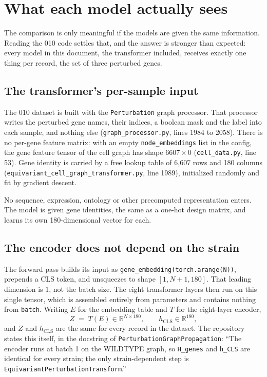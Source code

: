 
\section{What each model actually sees}
\label{sec:sees}

The comparison is only meaningful if the models are given the same information.
Reading the 010 code settles that, and the answer is stronger than expected:
every model in this document, the transformer included, receives exactly one
thing per record, the set of three perturbed genes.

\subsection{The transformer's per-sample input}

The 010 dataset is built with the \texttt{Perturbation} graph processor. That
processor writes the perturbed gene names, their indices, a boolean mask and the
label into each sample, and nothing else
(\texttt{graph\_processor.py}, lines 1984 to 2058). There is no per-gene feature
matrix: with an empty \texttt{node\_embeddings} list in the config, the gene
feature tensor of the cell graph has shape $6607 \times 0$
(\texttt{cell\_data.py}, line 53). Gene identity is carried by a free lookup
table of 6{,}607 rows and 180 columns
(\texttt{equivariant\_cell\_graph\_transformer.py}, line 1989), initialized
randomly and fit by gradient descent.

No sequence, expression, ontology or other precomputed representation enters.
The model is given gene identities, the same as a one-hot design matrix, and
learns its own 180-dimensional vector for each.

\subsection{The encoder does not depend on the strain}
\label{sec:encoder}

The forward pass builds its input as
\texttt{gene\_embedding(torch.arange(N))}, prepends a CLS token, and unsqueezes
to shape $[1, N{+}1, 180]$. That leading dimension is $1$, not the batch size.
The eight transformer layers then run on this single tensor, which is assembled
entirely from parameters and contains nothing from \texttt{batch}. Writing $E$
for the embedding table and $T$ for the eight-layer encoder,
%
\begin{equation}
  Z \;=\; T(E) \in \mathbb{R}^{N \times 180},
  \qquad
  h_{\mathrm{CLS}} \in \mathbb{R}^{180},
  \label{eq:encoder}
\end{equation}
%
and $Z$ and $h_{\mathrm{CLS}}$ are the same for every record in the dataset. The
repository states this itself, in the docstring of
\texttt{PerturbationGraphPropagation}: ``The encoder runs at batch 1 on the
WILDTYPE graph, so \texttt{H\_genes} and \texttt{h\_CLS} are identical for every
strain; the only strain-dependent step is
\texttt{EquivariantPerturbationTransform}.''

